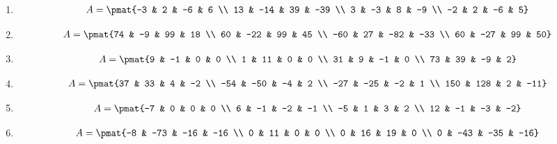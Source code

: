 \begin{enumerate}
\item

\begin{align*}
A = \pmat{-3 & 2 & -6 & 6 \\ 13 & -14 & 39 & -39 \\ 3 & -3 & 8 & -9 \\ -2 & 2 & -6 & 5}
\end{align*}

\item

\begin{align*}
A = \pmat{74 & -9 & 99 & 18 \\ 60 & -22 & 99 & 45 \\ -60 & 27 & -82 & -33 \\ 60 & -27 & 99 & 50}
\end{align*}

\item

\begin{align*}
A = \pmat{9 & -1 & 0 & 0 \\ 1 & 11 & 0 & 0 \\ 31 & 9 & -1 & 0 \\ 73 & 39 & -9 & 2}
\end{align*}

\item

\begin{align*}
A = \pmat{37 & 33 & 4 & -2 \\ -54 & -50 & -4 & 2 \\ -27 & -25 & -2 & 1 \\ 150 & 128 & 2 & -11}
\end{align*}

\item

\begin{align*}
A = \pmat{-7 & 0 & 0 & 0 \\ 6 & -1 & -2 & -1 \\ -5 & 1 & 3 & 2 \\ 12 & -1 & -3 & -2}
\end{align*}

\item

\begin{align*}
A = \pmat{-8 & -73 & -16 & -16 \\ 0 & 11 & 0 & 0 \\ 0 & 16 & 19 & 0 \\ 0 & -43 & -35 & -16}
\end{align*}


\end{enumerate}
